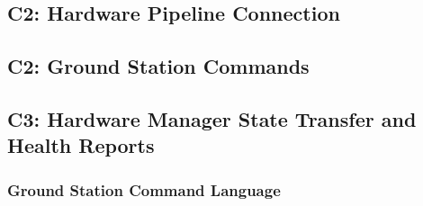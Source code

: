 \documentclass{mxl-design}
\begin{document}
\subsection{C2: Hardware Pipeline Connection}

\subsection{C2: Ground Station Commands}

\subsection{C3: Hardware Manager State Transfer and Health Reports}

\subsubsection{Ground Station Command Language}

\end{document}
